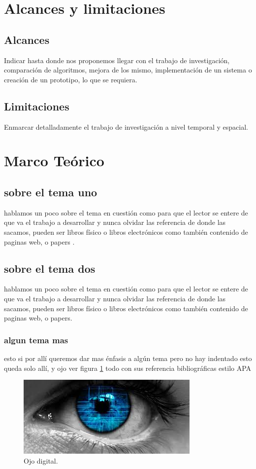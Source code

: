 \documentclass[a4paper,12pt]{report}
\begin{document}
\section{Alcances y limitaciones}
\subsection{Alcances}
Indicar hasta donde nos proponemos llegar con el trabajo de investigación, comparación de algoritmos, mejora de los mismo, implementación de un sistema o creación de un prototipo, lo que se requiera.
\subsection{Limitaciones}
Enmarcar detalladamente el trabajo de investigación a nivel temporal y espacial.

\section{Marco Teórico}
\subsection{sobre el tema uno}
hablamos un poco sobre el tema en cuestión como para que el lector se entere de que va el trabajo a desarrollar y nunca olvidar las referencia de donde las sacamos, pueden ser libros físico o libros electrónicos como también contenido de paginas web, o papers \citep{Larranaga}.
\subsection{sobre el tema dos}
hablamos un poco sobre el tema en cuestión como para que el lector se entere de que va el trabajo a desarrollar y nunca olvidar las referencia de donde las sacamos, pueden ser libros físico o libros electrónicos como también contenido de paginas web, o papers\citep{herz01}.
\subsubsection{algun tema mas}
esto si por allí queremos dar mas énfasis a algún tema pero no hay indentado esto queda solo allí, y ojo  ver figura \ref{fig:ojo01} todo con sus referencia bibliográficas estilo APA

\begin{figure}[htb]
	\centering	
	\includegraphics[scale=0.5]{imagenes/ojo.jpg}
	\caption{Ojo digital.}
	\label{fig:ojo01}
\end{figure}
\end{document}
